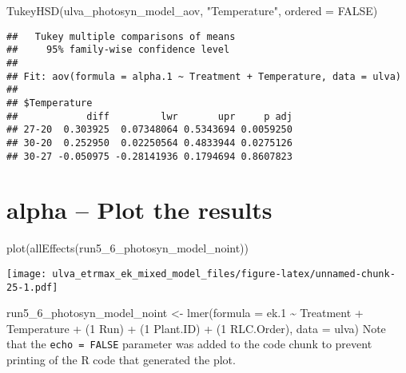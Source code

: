 \documentclass[
]{article}
\newenvironment{Shaded}{\begin{snugshade}}{\end{snugshade}}
\newcommand{\AttributeTok}[1]{\textcolor[rgb]{0.77,0.63,0.00}{#1}}
\newcommand{\ConstantTok}[1]{\textcolor[rgb]{0.00,0.00,0.00}{#1}}
\newcommand{\FunctionTok}[1]{\textcolor[rgb]{0.00,0.00,0.00}{#1}}
\newcommand{\NormalTok}[1]{#1}
\newcommand{\StringTok}[1]{\textcolor[rgb]{0.31,0.60,0.02}{#1}}
\begin{document}
\begin{Shaded}
\begin{Highlighting}[]
\FunctionTok{TukeyHSD}\NormalTok{(ulva\_photosyn\_model\_aov, }\StringTok{"Temperature"}\NormalTok{, }\AttributeTok{ordered =} \ConstantTok{FALSE}\NormalTok{)}
\end{Highlighting}
\end{Shaded}

\begin{verbatim}
##   Tukey multiple comparisons of means
##     95% family-wise confidence level
## 
## Fit: aov(formula = alpha.1 ~ Treatment + Temperature, data = ulva)
## 
## $Temperature
##            diff         lwr       upr     p adj
## 27-20  0.303925  0.07348064 0.5343694 0.0059250
## 30-20  0.252950  0.02250564 0.4833944 0.0275126
## 30-27 -0.050975 -0.28141936 0.1794694 0.8607823
\end{verbatim}

\hypertarget{alpha-plot-the-results}{%
\section{alpha -- Plot the results}\label{alpha-plot-the-results}}

\begin{Shaded}
\begin{Highlighting}[]
\FunctionTok{plot}\NormalTok{(}\FunctionTok{allEffects}\NormalTok{(run5\_6\_photosyn\_model\_noint))}
\end{Highlighting}
\end{Shaded}

\texttt{[image: ulva\_etrmax\_ek\_mixed\_model\_files/figure-latex/unnamed-chunk-25-1.pdf]}

run5\_6\_photosyn\_model\_noint \textless- lmer(formula = ek.1
\textasciitilde{} Treatment + Temperature + (1 \textbar{} Run) + (1
\textbar{} Plant.ID) + (1 \textbar{} RLC.Order), data = ulva) Note that
the \texttt{echo\ =\ FALSE} parameter was added to the code chunk to
prevent printing of the R code that generated the plot.
\end{document}

